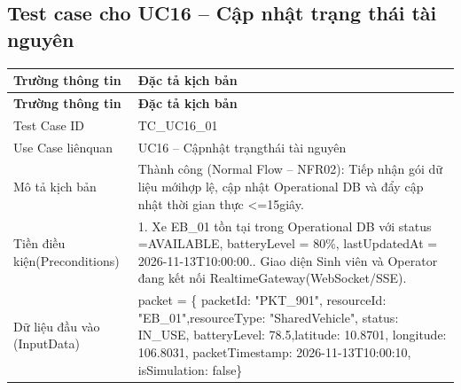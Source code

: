 \subsection{Test case cho UC16 – Cập nhật trạng thái tài nguyên}
\begin{longtable}{|L{0.24\textwidth}|L{0.70\textwidth}|}
\hline
\textbf{Trường thông tin} & \textbf{Đặc tả kịch bản} \\
\hline
\endfirsthead
\hline
\textbf{Trường thông tin} & \textbf{Đặc tả kịch bản} \\
\hline
\endhead
Test Case ID & TC\_UC16\_01 \\
\hline
Use Case liênquan & UC16 – Cậpnhật trạngthái tài nguyên \\
\hline
Mô tả kịch bản & Thành công (Normal Flow – NFR02): Tiếp nhận gói dữ liệu mới\newline hợp lệ, cập nhật Operational DB và đẩy cập nhật thời gian thực <=\newline 15giây. \\
\hline
Tiền điều kiện\newline (Preconditions) & 1. Xe EB\_01 tồn tại trong Operational DB với status =\newline AVAILABLE, batteryLevel = 80\%, lastUpdatedAt = 2026-11-\newline 13T10:00:00.. Giao diện Sinh viên và Operator đang kết nối RealtimeGateway\newline (WebSocket/SSE). \\
\hline
Dữ liệu đầu vào (Input\newline Data) & packet = \{ packetId: "PKT\_901", resourceId: "EB\_01",\newline resourceType: "SharedVehicle", status: IN\_USE, batteryLevel: 78.5,\newline latitude: 10.8701, longitude: 106.8031, packetTimestamp: 2026-11-\newline 13T10:00:10, isSimulation: false\} \\
\hline
\end{longtable}
\vspace{-0.5\baselineskip}
